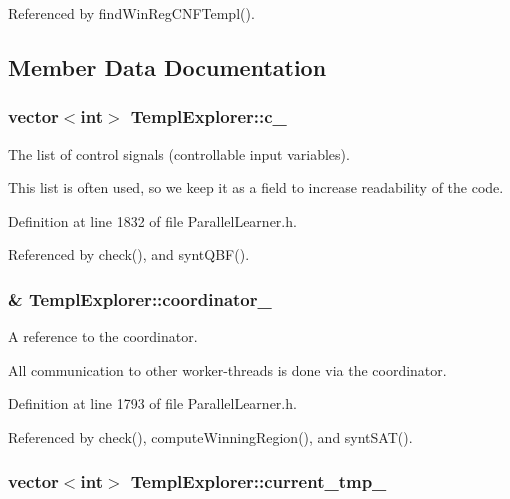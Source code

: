 Referenced by find\-Win\-Reg\-C\-N\-F\-Templ().



\subsection{Member Data Documentation}
\hypertarget{classTemplExplorer_a84a186d44f9ac9234dfeb9d5960951cf}{
\subsubsection[{c\-\_\-}]{\setlength{\rightskip}{0pt plus 5cm}vector$<$int$>$ Templ\-Explorer\-::c\-\_\-\hspace{0.3cm}{\ttfamily [protected]}}}\label{classTemplExplorer_a84a186d44f9ac9234dfeb9d5960951cf}


The list of control signals (controllable input variables). 

This list is often used, so we keep it as a field to increase readability of the code. 

Definition at line 1832 of file Parallel\-Learner.\-h.



Referenced by check(), and synt\-Q\-B\-F().

\hypertarget{classTemplExplorer_af660959dc5cc8c3ceb02389ee8f97753}{
\subsubsection[{coordinator\-\_\-}]{\& Templ\-Explorer\-::coordinator\-\_\-\hspace{0.3cm}{\ttfamily [protected]}}}\label{classTemplExplorer_af660959dc5cc8c3ceb02389ee8f97753}


A reference to the coordinator. 

All communication to other worker-\/threads is done via the coordinator. 

Definition at line 1793 of file Parallel\-Learner.\-h.



Referenced by check(), compute\-Winning\-Region(), and synt\-S\-A\-T().

\hypertarget{classTemplExplorer_a2fdba5ec13386e390ca5bb2023afee9c}{
\subsubsection[{current\-\_\-tmp\-\_\-}]{\setlength{\rightskip}{0pt plus 5cm}vector$<$int$>$ Templ\-Explorer\-::current\-\_\-tmp\-\_\-\hspace{0.3cm}{\ttfamily [protected]}}}\label{classTemplExplorer_a2fdba5ec13386e390ca5bb2023afee9c}


